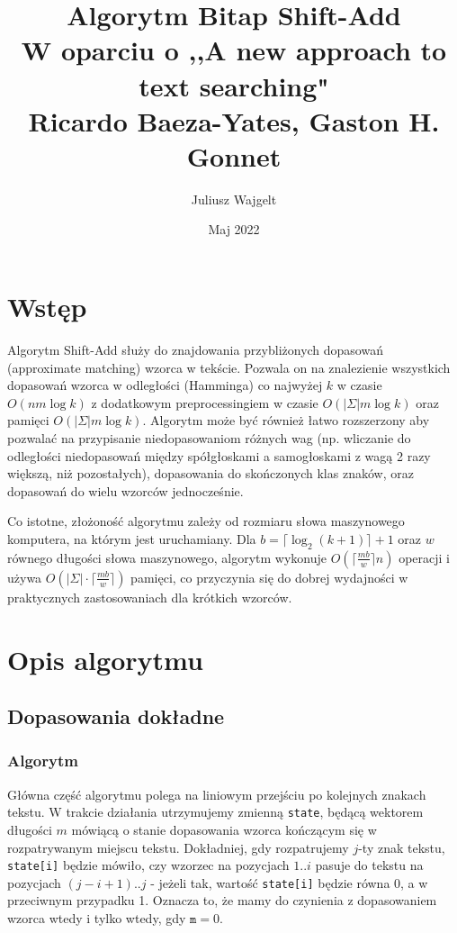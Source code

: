 \documentclass{article}
\title{Algorytm Bitap Shift-Add \\ \large W oparciu o ,,A new approach to text searching"\\ Ricardo Baeza-Yates, Gaston H. Gonnet}
\author{Juliusz Wajgelt}
\date{Maj 2022}
\begin{document}
\maketitle

\section{Wstęp}
Algorytm Shift-Add służy do znajdowania przybliżonych dopasowań (approximate matching) wzorca w tekście.
Pozwala on na znalezienie wszystkich dopasowań wzorca w odległości (Hamminga) co najwyżej $k$ w czasie $O(nm\log k)$ z dodatkowym preprocessingiem w czasie $O(|\Sigma|m\log k)$ oraz pamięci $O(|\Sigma|m\log k)$.
Algorytm może być również łatwo rozszerzony aby pozwalać na przypisanie niedopasowaniom różnych wag (np. wliczanie do odległości niedopasowań między spółgłoskami a samogłoskami z wagą 2 razy większą, niż pozostałych), dopasowania do skończonych klas znaków, oraz dopasowań do wielu wzorców jednocześnie.

Co istotne, złożoność algorytmu zależy od rozmiaru słowa maszynowego komputera, na którym jest uruchamiany. Dla $b=\lceil \log_2(k+1) \rceil+1$ oraz $w$ równego długości słowa maszynowego, algorytm wykonuje $O(\lceil\frac{mb}{w}\rceil n)$ operacji i używa $O(|\Sigma|\cdot\lceil\frac{mb}{w}\rceil)$ pamięci, co przyczynia się do dobrej wydajności w praktycznych zastosowaniach dla krótkich wzorców.

\section{Opis algorytmu}

\subsection{Dopasowania dokładne}
\subsubsection*{Algorytm}
Główna część algorytmu polega na liniowym przejściu po kolejnych znakach tekstu.
W trakcie działania utrzymujemy zmienną \texttt{state}, będącą wektorem długości $m$ mówiącą o stanie dopasowania wzorca kończącym się w rozpatrywanym miejscu tekstu.
Dokładniej, gdy rozpatrujemy $j$-ty znak tekstu, \texttt{state[i]} będzie mówiło, czy wzorzec na pozycjach $1..i$ pasuje do tekstu na pozycjach $(j-i+1)..j$ - jeżeli tak, wartość \texttt{state[i]} będzie równa 0, a w przeciwnym przypadku 1.
Oznacza to, że mamy do czynienia z dopasowaniem wzorca wtedy i tylko wtedy, gdy $\texttt{m}=0$.
\end{document}
